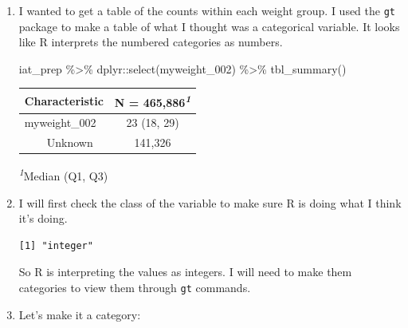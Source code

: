 \documentclass[
  letterpaper,
  DIV=11,
  numbers=noendperiod]{scrartcl}
\newenvironment{Shaded}{\begin{snugshade}}{\end{snugshade}}
\newcommand{\FunctionTok}[1]{\textcolor[rgb]{0.28,0.35,0.67}{#1}}
\newcommand{\NormalTok}[1]{\textcolor[rgb]{0.00,0.23,0.31}{#1}}
\newcommand{\SpecialCharTok}[1]{\textcolor[rgb]{0.37,0.37,0.37}{#1}}
\begin{document}
\begin{enumerate}
\def\labelenumi{\arabic{enumi}.}
\item
  I wanted to get a table of the counts within each weight group. I used
  the \texttt{gt} package to make a table of what I thought was a
  categorical variable. It looks like R interprets the numbered
  categories as numbers.

\begin{Shaded}
\begin{Highlighting}[]
\NormalTok{iat\_prep }\SpecialCharTok{\%\textgreater{}\%}
\NormalTok{  dplyr}\SpecialCharTok{::}\FunctionTok{select}\NormalTok{(myweight\_002) }\SpecialCharTok{\%\textgreater{}\%}
  \FunctionTok{tbl\_summary}\NormalTok{()}
\end{Highlighting}
\end{Shaded}

  \begin{table}
  \fontsize{12.0pt}{14.4pt}\selectfont
  \begin{tabular*}{\linewidth}{@{\extracolsep{\fill}}lc}
  \toprule
  \textbf{Characteristic} & \textbf{N = 465,886}\textsuperscript{\textit{1}} \\ 
  \midrule\addlinespace[2.5pt]
  myweight\_002 & 23 (18, 29) \\ 
      Unknown & 141,326 \\ 
  \bottomrule
  \end{tabular*}
  \begin{minipage}{\linewidth}
  \textsuperscript{\textit{1}}Median (Q1, Q3)\\
  \end{minipage}
  \end{table}
\item
  I will first check the class of the variable to make sure R is doing
  what I think it's doing.

\begin{Shaded}
\end{Shaded}

\begin{verbatim}
[1] "integer"
\end{verbatim}

  So R is interpreting the values as integers. I will need to make them
  categories to view them through \texttt{gt} commands.
\item
  Let's make it a category:


\end{enumerate}
\end{document}
